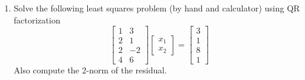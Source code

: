 \documentclass[10pt,letterpaper]{article}
\begin{document}
\begin{enumerate}[label=\textbf{(\alph{enumi})}, wide=0pt]
\begin{enumerate}[label=(\roman{enumii})]
$$\begin{bmatrix}
\frac{2}{3} \\
-\frac{2}{3} \\
\frac{1}{3} 
\end{bmatrix}$$
The QR factorization is
$$A = \begin{bmatrix}
\frac{1}{3} & \frac{2}{3} & \frac{2}{3} \\
\frac{2}{3} & \frac{1}{3} & -\frac{2}{3} \\
\frac{2}{3} & -\frac{2}{3} & \frac{1}{3} 
\end{bmatrix}\begin{bmatrix}
3 & 6 & 3 \\
0 & 3 & 6 \\
0 & 0 & 3 
\end{bmatrix} = QR$$

\end{enumerate}
\color{black}

\item Solve the following least squares problem (by hand and calculator) using QR factorization
$$\begin{bmatrix}
1 & 3 \\
2 & 1 \\
2 & -2 \\
4 & 6 
\end{bmatrix}\begin{bmatrix}
x_{1} \\
x_{2} 
\end{bmatrix} = \begin{bmatrix}
3 \\
1 \\
8 \\
1 
\end{bmatrix}$$
Also compute the 2-norm of the residual. 


\end{enumerate}
\end{document}
